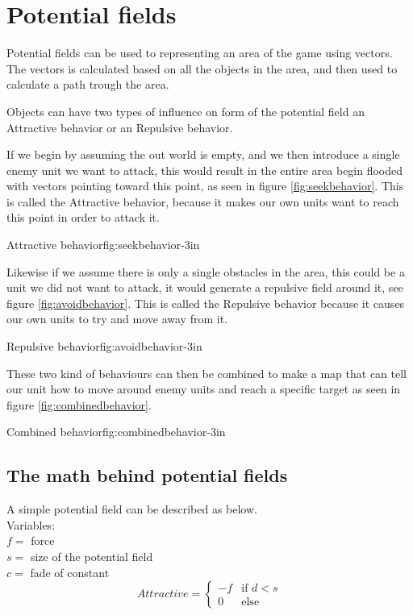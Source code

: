 \section{Potential fields}
	Potential fields can be used to representing an area of the game using vectors.  The vectors is calculated based on all the objects in the area, and then used to calculate a path trough the area.

	Objects can have two types of influence on form of the potential field an Attractive behavior or an Repulsive behavior.
	
	If we begin by assuming the out world is empty, and we then introduce a single enemy unit we want to attack, this would result in the entire area begin flooded with vectors pointing toward this point, as seen in figure \ref{fig:seekbehavior}. This is called the Attractive behavior, because it makes our own units want to reach this point in order to attack it.
	
		{Attractive behavior\cite{pft}}{fig:seekbehavior}{-3in}
	
	Likewise if we assume there is only a single obstacles in the area, this could be a unit we did not want to attack, it would generate a repulsive field around it, see figure \ref{fig:avoidbehavior}. This is called the Repulsive behavior because it causes our own units to try and move away from it.

		{Repulsive behavior\cite{pft}}{fig:avoidbehavior}{-3in}
		
	These two kind of behaviours can then be combined to make a map that can tell our unit how to move around enemy units and reach a specific target as seen in figure \ref{fig:combinedbehavior}.
	
		{Combined behavior\cite{pft}}{fig:combinedbehavior}{-3in}
		
	\subsection{The math behind potential fields}
		A simple potential field can be described as below.\\
		
		Variables:\\
		$f =$ force\\
		$s =$ size of the potential field\\
		$c =$ fade of constant\\
		\begin{displaymath}
			Attractive = \begin{cases}
					-f & \text{if $d < s$}\\
					0 & \text{else}
				\end{cases}		
		\end{displaymath}
			
